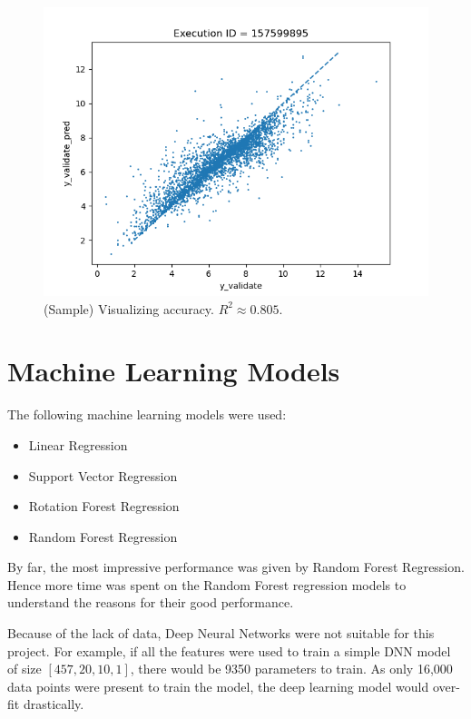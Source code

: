 \documentclass[11pt]{article}
\begin{document}
\begin{figure}[htb]
  \centering
    \includegraphics[width=1.0\textwidth]{images/accuracy_validate}
    \caption{(Sample) Visualizing accuracy.  $R^2 \approx 0.805$.}
    \label{fig:modelQualityVisualization}
\end{figure}


\section{Machine Learning Models}
\label{MachineLearningModelslabel}
The following machine learning models were used:
\begin{itemize}
\item Linear Regression
\item Support Vector Regression
\item Rotation Forest Regression
\item Random Forest Regression
\end{itemize}

By far, the most impressive performance was given by Random Forest Regression.
Hence more time was spent on the Random Forest regression models to understand the reasons for their good performance.

Because of the lack of data, Deep Neural Networks were not suitable for this project. 
For example, if all the features were used to train a simple DNN model of size $[457,  20, 10,  1]$,  there would be 9350 parameters to train.  As only 16,000 data points were present to train the model,  the deep learning model would over-fit drastically.
\end{document}
